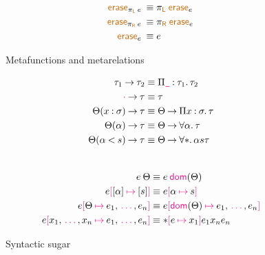 \documentclass{article}
\newcommand{\meta}[1]{\mathsf{\textcolor{metacolour}{#1}}}
\newcommand{\constr}[1]{\mathsf{\textcolor{constrcolour}{#1}}}
\newcommand{\kw}[1]{\mathsf{\textcolor{kwcolour}{#1}}}
\newcommand{\kwopen}[1]{\kw{#1}\:}
\newcommand{\kwbin}[1]{\:\kw{#1}\:}
\newcommand{\annot}[2]{#1 \mathbin{:} #2}
\newcommand{\bound}[2]{#1 \mathbin{<} #2}
\newcommand{\poly}[2]{\forall #1 \mathpunct{.} #2}
\newcommand{\fun}[3]{\Pi #1 \mathbin{:} #2 \mathpunct{.} #3}
\newcommand{\arr}[2]{#1 \mathbin{\rightarrow} \phantom{} #2}
\newcommand{\app}[2]{#1 \: #2}
\newcommand{\letin}[4]{\kwopen{let} #1 \mathbin{\coloneqq} \phantom{} #3 \kwbin{in} #4}
\newcommand{\prjl}[1]{\pi_{\kw{L}} \: #1}
\newcommand{\prjr}[1]{\pi_{\kw{R}} \: #1}
\newcommand{\some}[2]{\exists #1 \mathpunct{.} #2}
\newcommand{\pack}[2]{\mathopen{(} #1 \mathpunct{,} #2 \mathclose{)}}
\newcommand{\unpack}[4]{\kwopen{let} \pack{#1}{#2} \mathbin{\coloneqq} #3 \kwbin{in} #4}
\newcommand{\erase}[2]{\mathopen{\kw{erase}_{#1}} \: #2}
\newcommand{\refl}{\constr{refl}}
\newcommand{\equal}[3]{#1 \stackrel{#2}{=\joinrel=} #3}
\newcommand{\J}[3]{\constr{J}_{#1} \: #2 \: #3}
\newcommand{\?}{\meta{?}}
\newcommand{\mt}{\meta{\cdot}}
\newcommand{\seq}{\,\meta{\dots}\,}
\newcommand{\any}{\meta{\texttt{\_}}}
\newcommand{\dom}{\meta{dom}}
\newcommand{\subst}[3]{#1 \mathopen{\meta{[}} #2 \mathbin{\meta{\mapsto}} #3 \mathclose{\meta{]}}}
\theoremstyle{definition}
\begin{document}
\begin{figure}[!h]
\begin{align*}
        \erase{\prjl{e}} &\equiv \prjl{\erase{e}} \\
        \erase{\prjr{e}} &\equiv \prjr{\erase{e}} \\
        \erase{e} &\equiv e
    \end{align*}
    \fi
    \caption{Metafunctions and metarelations}
    \label{fig:metafunctions}
\end{figure}

\begin{figure}[!h]
    \centering
    \begin{multicols}{2}
    \begin{align*}
        \arr{\tau_1}{\tau_2} &\equiv \fun{\any}{\tau_1}{\tau_2} \\
        \arr{\mt}{\tau} &\equiv \tau \\
        \arr{\Theta(\annot{x}{\sigma})}{\tau} &\equiv \arr{\Theta}{\fun{x}{\sigma}{\tau}} \\
        \arr{\Theta(\alpha)}{\tau} &\equiv \arr{\Theta}{\poly{\alpha}{\tau}} \\
        \arr{\Theta(\bound{\alpha}{s})}{\tau} &\equiv \arr{\Theta}{\poly*{\alpha}{s}{\tau}} \\
    \end{align*}
    \\
    \begin{align*}
        \app{e}{\Theta} &\equiv \app{e}{\dom(\Theta)} \\
        \subst{e}{\mathopen{[} \alpha \mathclose{]}}{\mathopen{[} s \mathclose{]}} &\equiv \subst{e}{\alpha}{s} \\
        \subst{e}{\Theta}{e_1, \seq, e_n} &\equiv \subst{e}{\dom(\Theta)}{e_1, \seq, e_n} \\
        \subst{e}{x_1, \seq, x_n}{e_1, \seq, e_n} &\equiv \subst*{e}{x_1}{e_1}{x_n}{e_n}
    \end{align*}
    \end{multicols}
    \caption{Syntactic sugar}
    \label{fig:sugar}
\end{figure}
\end{document}
